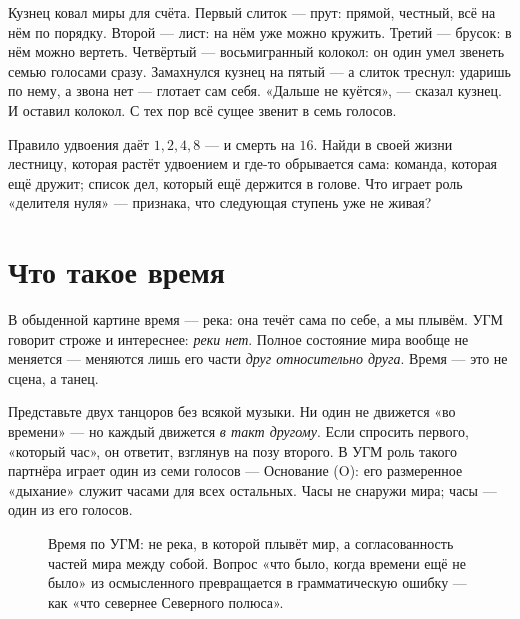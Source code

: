 \documentclass[11pt,letterpaper]{article}
\begin{document}
\begin{skazbox}
Кузнец ковал миры для счёта. Первый слиток --- прут: прямой, честный,
всё на нём по порядку. Второй --- лист: на нём уже можно кружить.
Третий --- брусок: в нём можно вертеть. Четвёртый --- восьмигранный
колокол: он один умел звенеть семью голосами сразу. Замахнулся кузнец
на пятый --- а слиток треснул: ударишь по нему, а звона нет ---
глотает сам себя. «Дальше не куётся», --- сказал кузнец. И оставил
колокол. С тех пор всё сущее звенит в семь голосов.
\end{skazbox}

\begin{askbox}
Правило удвоения даёт $1, 2, 4, 8$ --- и смерть на $16$. Найди в
своей жизни лестницу, которая растёт удвоением и где-то обрывается
сама: команда, которая ещё дружит; список дел, который ещё держится в
голове. Что играет роль «делителя нуля» --- признака, что следующая
ступень уже не живая?
\end{askbox}

\section{Что такое время}
\label{sec:time}

В обыденной картине время --- река: она течёт сама по себе, а мы
плывём. УГМ говорит строже и интереснее: \emph{реки нет}. Полное
состояние мира вообще не меняется --- меняются лишь его части
\emph{друг относительно друга}. Время --- это не сцена, а танец.

Представьте двух танцоров без всякой музыки. Ни один не движется «во
времени» --- но каждый движется \emph{в такт другому}. Если спросить
первого, «который час», он ответит, взглянув на позу второго. В УГМ
роль такого партнёра играет один из семи голосов --- Основание (O):
его размеренное «дыхание» служит часами для всех остальных. Часы не
снаружи мира; часы --- один из его голосов.

\begin{figure}[H]
\centering
{}
\caption{Время по УГМ: не река, в которой плывёт мир, а согласованность
частей мира между собой. Вопрос «что было, когда времени ещё не было»
из осмысленного превращается в грамматическую ошибку --- как «что
севернее Северного полюса».}
\label{fig:time}
\end{figure}
\end{document}
